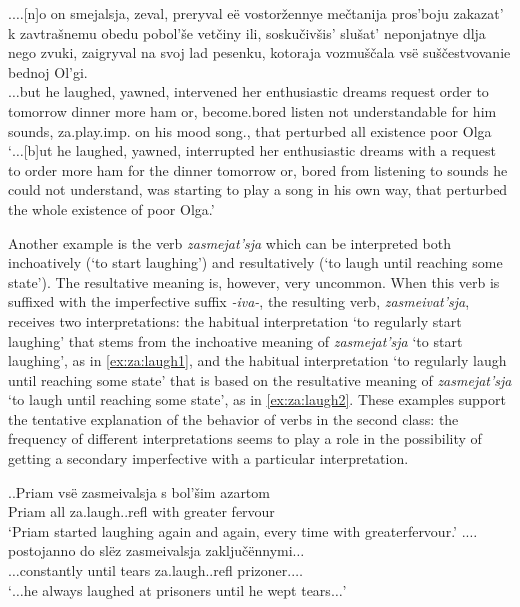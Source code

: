 \exg.\label{ex:zaigryvat}$\ldots$[n]o on smejalsja, zeval, preryval e\"{e} vostor\v{z}ennye me\v{c}tanija pros'boju zakazat' k zavtra\v{s}nemu obedu pobol'\v{s}e vet\v{c}iny ili, sosku\v{c}iv\v{s}is' slu\v{s}at' neponjatnye dlja nego zvuki, zaigryval na svoj lad pesenku, kotoraja vozmu\v{s}\v{c}ala vs\"{e} su\v{s}\v{c}estvovanie bednoj Ol'gi.\\
$\ldots$but he laughed, yawned, intervened her enthusiastic dreams request order to tomorrow dinner more ham or, {become.bored} listen {not understandable} for him sounds, za.play.imp. on his mood song., that perturbed all existence poor Olga\\
\trans `$\ldots$[b]ut he laughed, yawned, interrupted her enthusiastic dreams with a request to order more ham for the dinner tomorrow or, bored from listening to sounds he could not understand, was starting to play a song in his own way, that perturbed the whole existence of poor Olga.'\\

Another example is the verb \textit{zasmejat'sja} which can be interpreted both inchoatively  (`to start laughing') and resultatively  (`to laugh until reaching some state'). The resultative  meaning is, however, very uncommon. When this verb is suffixed with the imperfective suffix   \textit{-iva-}, the resulting verb, \textit{zasmeivat'sja}, receives two interpretations: the habitual interpretation `to regularly start laughing' that stems from the inchoative  meaning of \textit{zasmejat'sja} `to start laughing', as in \ref{ex:za:laugh1}, and the habitual interpretation `to regularly laugh until reaching some state' that is based on the resultative  meaning of \textit{zasmejat'sja} `to laugh until reaching some state', as in \ref{ex:za:laugh2}. These examples support the tentative explanation of the behavior of verbs in the second class: the frequency of different interpretations seems to play a role in the possibility of getting a secondary imperfective  with a particular interpretation.

\ex.\label{ex:za:laugh}\ag.\label{ex:za:laugh1}Priam vs\"{e} zasmeivalsja s bol'\v{s}im azartom\\
Priam all za.laugh..refl with greater fervour\\
\trans `Priam started laughing again and again, every time with greater\linebreak fervour.'
\bg.\label{ex:za:laugh2}$\ldots$postojanno do sl\"{e}z zasmeivalsja zaklju\v{c}\"{e}nnymi$\ldots$\\
$\ldots$constantly until tears za.laugh..refl prizoner.$\ldots$\\
\trans `$\ldots$he always laughed at prisoners until he wept tears$\ldots$'


